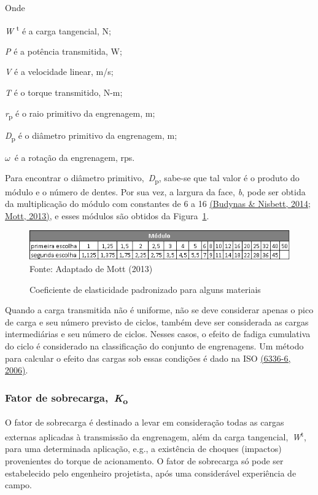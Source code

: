 \documentclass[12pt,a4paper]{article}
\begin{document}
Onde

\emph{W} \textsuperscript{t} é a carga tangencial, N;

\emph{P} é a potência transmitida, W;

\emph{V} é a velocidade linear, m/s;

\emph{T} é o torque transmitido, N-m;

\emph{r}\textsubscript{p} é o raio primitivo da engrenagem, m;

\emph{D}\textsubscript{p} é o diâmetro primitivo da engrenagem, m;

$\omega$\ é a rotação da engrenagem, rps.

Para encontrar o diâmetro primitivo,~\emph{D}\textsubscript{p}, sabe-se
que tal valor é o produto do módulo e o número de dentes. Por sua vez, a
largura da face, \emph{b}, pode ser obtida da multiplicação do módulo
com constantes de 6 a 16 \hyperref[csl:20]{(Budynas \& Nisbett, 2014}; \hyperref[csl:21]{Mott, 2013)}, e esses módulos são obtidos
da Figura~\ref{fig:2}.

\begin{figure}[!htb]
 \centering
    \caption{Coeficiente de elasticidade padronizado para alguns materiais}
    \includegraphics[scale=1]{Imagens/Img2.png}
    {\footnotesize Fonte: Adaptado de Mott (2013)}
    \label{fig:2}
\end{figure}

Quando a carga transmitida não é uniforme, não se deve considerar apenas
o pico de carga e seu número previsto de ciclos, também deve ser
considerada as cargas intermediárias e seu número de ciclos. Nesses
casos, o efeito de fadiga cumulativa do ciclo é considerado na
classificação do conjunto de engrenagens. Um método para calcular o
efeito das cargas sob essas condições é dado na ISO \hyperref[csl:22]{(6336-6, 2006)}.

\subsubsection*{\texorpdfstring{Fator de
sobrecarga,~\emph{K}\textsubscript{o}}{Fator de sobrecarga,~Ko}}

{\label{fator-de-sobrecarga-ko}}

O fator de sobrecarga é destinado a levar em consideração todas as
cargas externas aplicadas à transmissão da engrenagem, além da carga
tangencial,~\emph{W}\textsuperscript{t}, para uma determinada aplicação,
e.g., a existência de choques (impactos) provenientes do torque de
acionamento. O fator de sobrecarga só pode ser estabelecido pelo
engenheiro projetista, após uma considerável experiência de campo.
\end{document}
